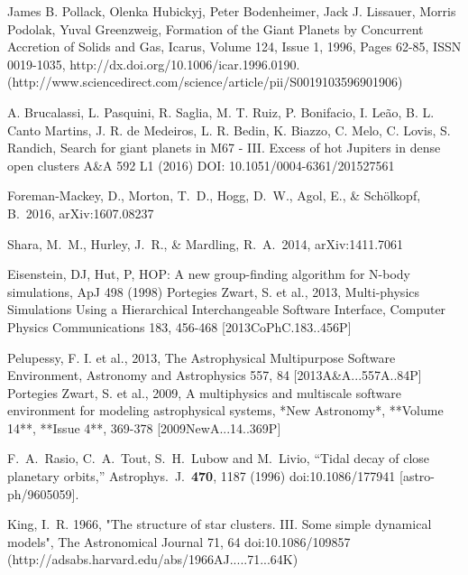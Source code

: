 \documentclass[12pt]{article}
\begin{document}
\begin{thebibliography}{9}

James B. Pollack, Olenka Hubickyj, Peter Bodenheimer, Jack J. Lissauer, Morris Podolak, Yuval Greenzweig, Formation of the Giant Planets by Concurrent Accretion of Solids and Gas, Icarus, Volume 124, Issue 1, 1996, Pages 62-85, ISSN 0019-1035, http://dx.doi.org/10.1006/icar.1996.0190.
(http://www.sciencedirect.com/science/article/pii/S0019103596901906)

A.  Brucalassi, L.  Pasquini, R.  Saglia, M. T.  Ruiz, P.  Bonifacio, I.  Leão, B. L.  Canto Martins, J. R.  de Medeiros, L. R.  Bedin, K.  Biazzo, C.  Melo, C.  Lovis, S.  Randich,
Search for giant planets in M67 - III. Excess of hot Jupiters in dense open clusters
A\&A 592 L1 (2016)
DOI: 10.1051/0004-6361/201527561

Foreman-Mackey, D., Morton, T.~D., Hogg, D.~W., Agol, E., \& Sch{\"o}lkopf, B.\ 2016, arXiv:1607.08237 

 Shara, M.~M., Hurley, J.~R., \& Mardling, R.~A.\ 2014, arXiv:1411.7061 

 Eisenstein, DJ, Hut, P, HOP: A new group-finding algorithm for N-body simulations, ApJ 498 (1998)
 Portegies Zwart, S. et al., 2013, Multi-physics Simulations Using a Hierarchical Interchangeable Software Interface, Computer Physics Communications 183, 456-468 [2013CoPhC.183..456P]
		
 Pelupessy, F. I. et al., 2013, The Astrophysical Multipurpose Software Environment, Astronomy and Astrophysics 557, 84 [2013A\&A...557A..84P]
 Portegies Zwart, S. et al., 2009, A multiphysics and multiscale software environment for modeling astrophysical systems, *New Astronomy*, **Volume 14**, **Issue 4**, 369-378 [2009NewA...14..369P]

  F.~A.~Rasio, C.~A.~Tout, S.~H.~Lubow and M.~Livio,
  ``Tidal decay of close planetary orbits,''
  Astrophys.\ J.\  {\bf 470}, 1187 (1996)
  doi:10.1086/177941
  [astro-ph/9605059].

 King, I.~R. 1966, "The structure of star clusters. III. Some simple dynamical models", The Astronomical Journal 71, 64 
doi:10.1086/109857
(http://adsabs.harvard.edu/abs/1966AJ.....71...64K)

\end{thebibliography}
\end{document}
